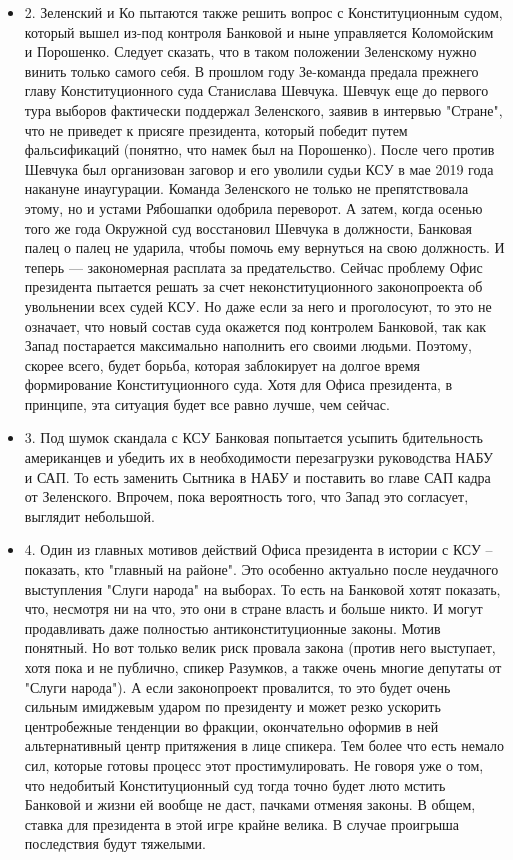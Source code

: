 \begin{itemize}
\item 2. Зеленский и Ко пытаются также решить вопрос с Конституционным судом,
				который вышел из-под контроля Банковой и ныне управляется Коломойским и
				Порошенко.  Следует сказать, что в таком положении Зеленскому нужно
				винить только самого себя. В прошлом году Зе-команда предала прежнего
				главу Конституционного суда Станислава Шевчука. Шевчук еще до первого
				тура выборов фактически поддержал Зеленского, заявив в интервью
				"Стране", что не приведет к присяге президента, который победит путем
				фальсификаций (понятно, что намек был на Порошенко).  После чего против
				Шевчука был организован заговор и его уволили судьи КСУ в мае 2019 года
				накануне инаугурации. Команда Зеленского не только не препятствовала
				этому, но и устами Рябошапки одобрила переворот. А затем, когда осенью
				того же года Окружной суд восстановил Шевчука в должности, Банковая
				палец о палец не ударила, чтобы помочь ему вернуться на свою должность.
				И теперь --- закономерная расплата за предательство. Сейчас проблему Офис
				президента пытается решать за счет неконституционного законопроекта об
				увольнении всех судей КСУ. Но даже если за него и проголосуют, то это
				не означает, что новый состав суда окажется под контролем Банковой, так
				как Запад постарается максимально наполнить его своими людьми. Поэтому,
				скорее всего, будет борьба, которая заблокирует на долгое время
				формирование Конституционного суда. Хотя для Офиса президента, в
				принципе, эта ситуация будет все равно лучше, чем сейчас.

\item 3. Под шумок скандала с КСУ Банковая попытается усыпить бдительность
				американцев и убедить их в необходимости перезагрузки руководства НАБУ
				и САП.  То есть заменить Сытника в НАБУ и поставить во главе САП кадра
				от Зеленского.  Впрочем, пока вероятность того, что Запад это
				согласует, выглядит небольшой.

\item 4. Один из главных мотивов действий Офиса президента в истории с КСУ –
				показать, кто "главный на районе". Это особенно актуально после
				неудачного выступления "Слуги народа" на выборах. То есть на Банковой
				хотят показать, что, несмотря ни на что, это они в стране власть и
				больше никто. И могут продавливать даже полностью антиконституционные
				законы. Мотив понятный. Но вот только велик риск провала закона (против
				него выступает, хотя пока и не публично, спикер Разумков, а также очень
				многие депутаты от "Слуги народа"). А если законопроект провалится, то
				это будет очень сильным имиджевым ударом по президенту и может резко
				ускорить центробежные тенденции во фракции, окончательно оформив в ней
				альтернативный центр притяжения в лице спикера. Тем более что есть
				немало сил, которые готовы процесс этот простимулировать. Не говоря уже
				о том, что недобитый Конституционный суд тогда точно будет люто мстить
				Банковой и жизни ей вообще не даст, пачками отменяя законы. В общем,
				ставка для президента в этой игре крайне велика. В случае проигрыша
				последствия будут тяжелыми.


\end{itemize}

